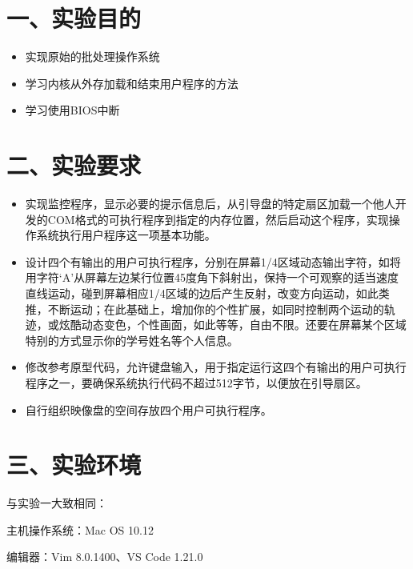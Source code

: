 \documentclass[ctexart]{article}
\date{}
\begin{document}
\hypertarget{header-n0}{%
\section{一、实验目的}\label{header-n0}}

\begin{itemize}
\item
  实现原始的批处理操作系统
\end{itemize}

\begin{itemize}
\item
  学习内核从外存加载和结束用户程序的方法
\item
  学习使用BIOS中断
\end{itemize}

\hypertarget{header-n13}{%
\section{二、实验要求}\label{header-n13}}

\begin{itemize}
\item
  实现监控程序，显示必要的提示信息后，从引导盘的特定扇区加载一个他人开发的COM格式的可执行程序到指定的内存位置，然后启动这个程序，实现操作系统执行用户程序这一项基本功能。
\item
  设计四个有输出的用户可执行程序，分别在屏幕1/4区域动态输出字符，如将用字符`A'从屏幕左边某行位置45度角下斜射出，保持一个可观察的适当速度直线运动，碰到屏幕相应1/4区域的边后产生反射，改变方向运动，如此类推，不断运动；在此基础上，增加你的个性扩展，如同时控制两个运动的轨迹，或炫酷动态变色，个性画面，如此等等，自由不限。还要在屏幕某个区域特别的方式显示你的学号姓名等个人信息。
\item
  修改参考原型代码，允许键盘输入，用于指定运行这四个有输出的用户可执行程序之一，要确保系统执行代码不超过512字节，以便放在引导扇区。
\item
  自行组织映像盘的空间存放四个用户可执行程序。
\end{itemize}

\hypertarget{header-n922}{%
\section{三、实验环境}\label{header-n922}}

与实验一大致相同：

主机操作系统：Mac OS 10.12

编辑器：Vim 8.0.1400、VS Code 1.21.0
\end{document}
